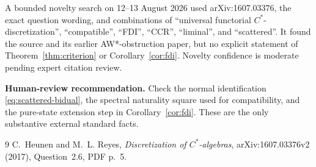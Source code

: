 \documentclass[11pt]{article}
\begin{document}
A bounded novelty search on 12--13 August 2026 used arXiv:1607.03376, the exact
question wording, and combinations of ``universal functorial
$C^*$-discretization'', ``compatible'', ``FDI'', ``CCR'', ``liminal'', and
``scattered''.  It found the source and its earlier AW*-obstruction paper, but
no explicit statement of Theorem~\ref{thm:criterion} or
Corollary~\ref{cor:fdi}.  Novelty confidence is moderate pending expert citation
review.

\medskip
\noindent\textbf{Human-review recommendation.}
Check the normal identification \eqref{eq:scattered-bidual}, the spectral
naturality square used for compatibility, and the pure-state extension step in
Corollary~\ref{cor:fdi}.  These are the only substantive external standard
facts.

\begin{thebibliography}{9}
C.~Heunen and M.~L. Reyes,
\emph{Discretization of $C^*$-algebras},
arXiv:1607.03376v2 (2017), Question~2.6, PDF p.~5.
\end{thebibliography}
\end{document}
